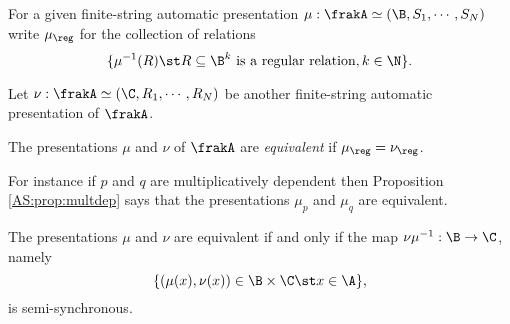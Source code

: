 

For a given finite-string automatic presentation $\mu:\frakA \simeq (\B,S_1,\cdots,S_N)$ 
write $\mu_{\reg}$ for the collection of relations
$$
\{\mu^{-1}(R) \st R \subseteq \B^k \text{ is a regular relation}, k \in \N\}.
$$

Let $\nu:\frakA \simeq (\C,R_1,\cdots,R_N)$ be another finite-string automatic presentation of $\frakA$.

\begin{definition} \cite{Bara06}
The presentations  $\mu$ and $\nu$ of $\frakA$ are {\em equivalent} if $\mu_{\reg}  = \nu_{\reg}$.
\end{definition}

For instance if $p$ and $q$ are multiplicatively dependent then Proposition \ref{AS:prop:multdep} says that the presentations $\mu_p$ and $\mu_q$ are equivalent.

\begin{theorem} \cite{Bara06}
The presentations $\mu$ and $\nu$ are equivalent if and only if the map $\nu \mu^{-1}:\B \to \C$, namely
 \[
  \{(\mu(x), \nu(x)) \in \B \times \C\st x \in \A\},
 \]
is semi-synchronous.
\end{theorem}

